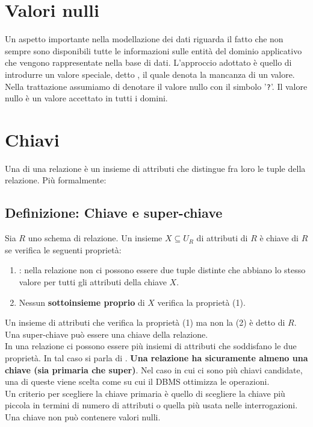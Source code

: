 \documentclass[12pt, a4paper]{report}
\begin{document}
        \section{Valori nulli}
            Un aspetto importante nella modellazione dei dati riguarda il fatto che non sempre sono disponibili tutte le informazioni sulle entità del dominio applicativo che vengono rappresentate nella base di dati. L'approccio adottato è quello di introdurre un valore speciale, detto , il quale denota la mancanza di un valore.\\
            Nella trattazione assumiamo di denotare il valore nullo con il simbolo '\texttt{?}'. Il valore nullo è un valore accettato in tutti i domini.
        \section{Chiavi}
            Una  di una relazione è un insieme di attributi che distingue fra loro le tuple della relazione. Più formalmente:
            \subsection{Definizione: Chiave e super-chiave}
                Sia $R$ uno schema di relazione. Un insieme $X\subseteq U_{R}$ di attributi di $R$ è chiave di $R$ se verifica le seguenti proprietà:
                \begin{enumerate}
                    \item {}: nella relazione non ci possono essere due tuple distinte che abbiano lo stesso valore per tutti gli attributi della chiave $X$.
                    \item Nessun \textbf{sottoinsieme proprio} di $X$ verifica la proprietà (1).
                \end{enumerate}
                Un insieme di attributi che verifica la proprietà (1) ma non la (2) è detto  di $R$. Una super-chiave può essere una chiave della relazione.\\
                In una relazione ci possono essere più insiemi di attributi che soddisfano le due proprietà. In tal caso si parla di . \textbf{Una relazione ha sicuramente almeno una chiave (sia primaria che super)}. Nel caso in cui ci sono più chiavi candidate, una di queste viene scelta come  su cui il DBMS ottimizza le operazioni.\\
                Un criterio per scegliere la chiave primaria è quello di scegliere la chiave più piccola in termini di numero di attributi o quella più usata nelle interrogazioni. Una chiave non può contenere valori nulli.
\end{document}
